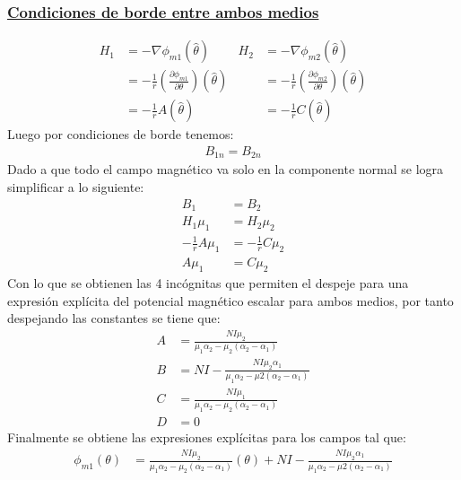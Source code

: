 \documentclass[
  11pt,
  letterpaper,
   addpoints,
   answers
  ]{exam}
\begin{document}
\begin{questions}
\begin{solution}
\begin{enumerate}
            \subsubsection*{\underline{Condiciones de borde entre ambos medios}}
            \begin{align}
               H_{1}&= -\nabla \phi_{m1} (\hat{\theta})   &   H_{2}&= -\nabla \phi_{m2} (\hat{\theta})\\
                    &= -\frac{1}{r}\left(\frac{\partial \phi_{m1}}{\partial\theta}\right) (\hat{\theta}) &      &= -\frac{1}{r}\left(\frac{\partial \phi_{m2}}{\partial\theta}\right) (\hat{\theta})\\
                    &= -\frac{1}{r} A (\hat{\theta})   &   &= -\frac{1}{r} C (\hat{\theta})   
            \end{align}
            Luego por condiciones de borde tenemos:
            \begin{align}
                B_{1n} = B_{2n}
            \end{align}
            Dado a que todo el campo magnético va solo en la componente normal se logra simplificar a lo siguiente:
            \begin{align}
                B_{1}         &=  B_{2}\\
                H_{1}\mu_{1}  &= H_{2}\mu_{2}\\
                -\frac{1}{r}A \mu_{1}&= -\frac{1}{r}C \mu_{2}\\
                A\mu_{1} &= C\mu_{2}
            \end{align}
            Con lo que se obtienen las 4 incógnitas que permiten el despeje para una expresión explícita del potencial magnético escalar para ambos medios, por tanto despejando las constantes se tiene que:
            \begin{align}
                A  &= \frac{NI \mu_{2}}{\mu_{1}\alpha_{2} - \mu_{2} (\alpha_{2} - \alpha_{1})}\\
                B  &= NI - \frac{NI \mu_{2} \alpha_{1}}{\mu_{1} \alpha_{2} - \mu{2}(\alpha_{2}- \alpha_{1})}\\ 
                C  &= \frac{NI \mu_{1}}{\mu_{1}\alpha_{2} - \mu_{2}(\alpha_{2} - \alpha_{1})}\\
                D  &= 0
            \end{align}
            Finalmente se obtiene las expresiones explícitas para los campos tal que:
            \begin{align}
                \phi_{m1}(\theta) &= \frac{NI \mu_{2}}{\mu_{1}\alpha_{2} - \mu_{2} (\alpha_{2} - \alpha_{1})}(\theta) +  NI - \frac{NI \mu_{2} \alpha_{1}}{\mu_{1} \alpha_{2} - \mu{2}(\alpha_{2}- \alpha_{1})}\\\\

\end{align}
\end{enumerate}
\end{solution}
\end{questions}
\end{document}
